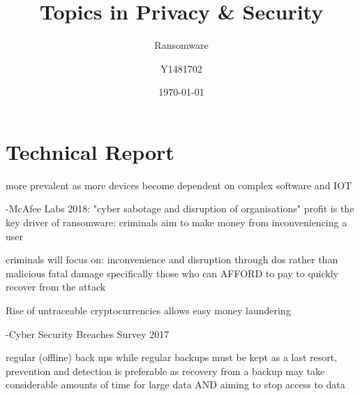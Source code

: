 \documentclass{article}
\title{Topics in Privacy \& Security}
\subtitle{Ransomware}
\author{Y1481702}
\date{\today}
\begin{document}
\begin{titlepage}
\maketitle
\tableofcontents
\end{titlepage}



\section{Technical Report}%





more prevalent as more devices become dependent on complex software and IOT

-McAfee Labs 2018:\cite{mcafee_2018}
"cyber sabotage and disruption of organisations"
profit is the key driver of ransomware: criminals aim to make money from inconveniencing a user

criminals will focus on:
inconvenience and disruption through dos rather than malicious fatal damage
specifically those who can AFFORD to pay to quickly recover from the attack

Rise of untraceable cryptocurrencies allows easy money laundering 


-Cyber Security Breaches Survey 2017\cite{security_breaches_survey}

regular (offline) back ups
while regular backups must be kept as a last resort, prevention and detection is preferable as recovery from a backup may take considerable amounts of time for large data AND aiming to stop access to data
\end{document}
